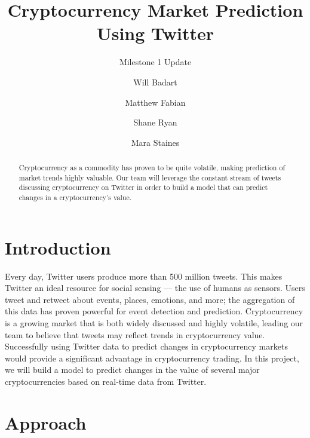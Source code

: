 \documentclass[sigconf]{acmart}
\begin{document}
\title{Cryptocurrency Market Prediction Using Twitter}
\subtitle{Milestone 1 Update}

\author{Will Badart}

\author{Matthew Fabian}

\author{Shane Ryan}

\author{Mara Staines}


\begin{abstract}
Cryptocurrency as a commodity has proven to be quite volatile, making prediction of market trends highly valuable. Our team will leverage the constant stream of tweets discussing cryptocurrency on Twitter in order to build a model that can predict changes in a cryptocurrency’s value.
\end{abstract}

\maketitle


\section{Introduction}
Every day, Twitter users produce more than 500 million tweets. This makes Twitter an ideal resource for social sensing --- the use of humans as sensors. Users tweet and retweet about events, places, emotions, and more; the aggregation of this data has proven powerful for event detection and prediction. Cryptocurrency is a growing market that is both widely discussed and highly volatile, leading our team to believe that tweets may reflect trends in cryptocurrency value. Successfully using Twitter data to predict changes in cryptocurrency markets would provide a significant advantage in cryptocurrency trading. In this project, we will build a model to predict changes in the value of several major cryptocurrencies based on real-time data from Twitter.


\section{Approach}
\end{document}
